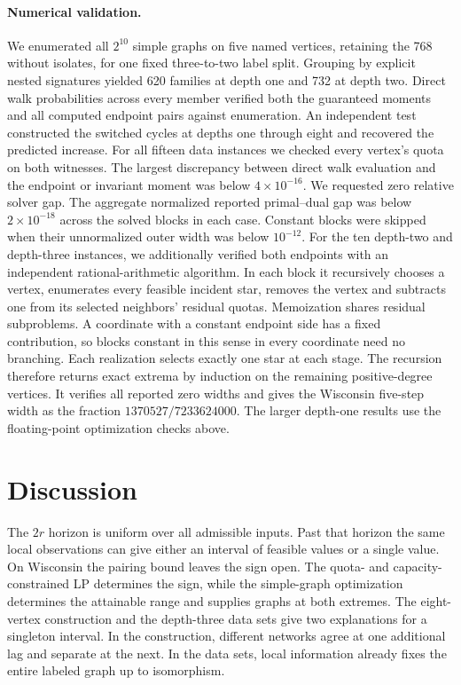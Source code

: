 \documentclass[11pt]{article}
\begin{document}
\paragraph{Numerical validation.}
We enumerated all $2^{10}$ simple graphs on five named vertices, retaining the 768 without isolates, for one fixed three-to-two label split. Grouping by explicit nested signatures yielded 620 families at depth one and 732 at depth two. Direct walk probabilities across every member verified both the guaranteed moments and all computed endpoint pairs against enumeration. An independent test constructed the switched cycles at depths one through eight and recovered the predicted increase. For all fifteen data instances we checked every vertex's quota on both witnesses. The largest discrepancy between direct walk evaluation and the endpoint or invariant moment was below $4\times10^{-16}$. We requested zero relative solver gap. The aggregate normalized reported primal--dual gap was below $2\times10^{-18}$ across the solved blocks in each case. Constant blocks were skipped when their unnormalized outer width was below $10^{-12}$. For the ten depth-two and depth-three instances, we additionally verified both endpoints with an independent rational-arithmetic algorithm. In each block it recursively chooses a vertex, enumerates every feasible incident star, removes the vertex and subtracts one from its selected neighbors' residual quotas. Memoization shares residual subproblems. A coordinate with a constant endpoint side has a fixed contribution, so blocks constant in this sense in every coordinate need no branching. Each realization selects exactly one star at each stage. The recursion therefore returns exact extrema by induction on the remaining positive-degree vertices. It verifies all reported zero widths and gives the Wisconsin five-step width as the fraction $1370527/7233624000$. The larger depth-one results use the floating-point optimization checks above.

\section{Discussion}
The $2r$ horizon is uniform over all admissible inputs. Past that horizon the same local observations can give either an interval of feasible values or a single value. On Wisconsin the pairing bound leaves the sign open. The quota- and capacity-constrained LP determines the sign, while the simple-graph optimization determines the attainable range and supplies graphs at both extremes. The eight-vertex construction and the depth-three data sets give two explanations for a singleton interval. In the construction, different networks agree at one additional lag and separate at the next. In the data sets, local information already fixes the entire labeled graph up to isomorphism.
\end{document}
